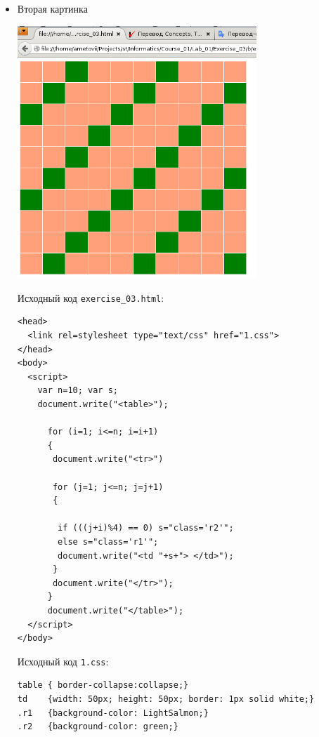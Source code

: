 \begin{itemize}
\item{Вторая картинка}

  \begin{center}
    \includegraphics[width=9cm]{img/exercise_03/b/01.png}
  \end{center}

  Исходный код \verb|exercise_03.html|:

\begin{verbatim}
<head>
  <link rel=stylesheet type="text/css" href="1.css">
</head>
<body>
  <script>
    var n=10; var s;
    document.write("<table>");

      for (i=1; i<=n; i=i+1)
      {
       document.write("<tr>")

       for (j=1; j<=n; j=j+1)
       {
     
        if (((j+i)%4) == 0) s="class='r2'";
        else s="class='r1'";
        document.write("<td "+s+"> </td>");
       }
       document.write("</tr>");
      }
      document.write("</table>");
  </script>
</body>
\end{verbatim}

Исходный код \verb|1.css|:

\begin{verbatim}
table { border-collapse:collapse;}
td    {width: 50px; height: 50px; border: 1px solid white;}
.r1   {background-color: LightSalmon;}
.r2   {background-color: green;}
\end{verbatim}
\end{itemize}
